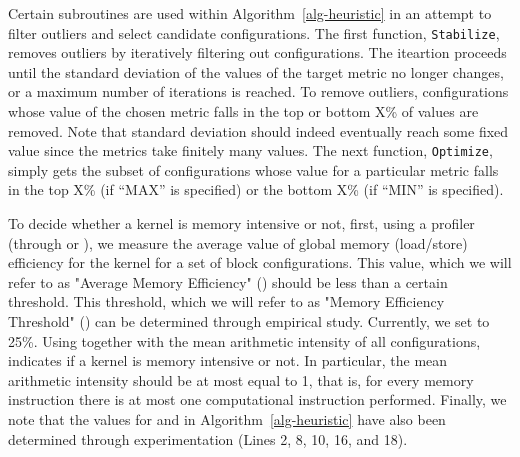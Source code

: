 

Certain subroutines are used within Algorithm~\ref{alg-heuristic}
in an attempt to filter outliers and select candidate configurations.
The first function, \texttt{Stabilize}, removes outliers
by iteratively filtering out configurations.
The iteartion proceeds until the standard deviation of the values
of the target metric no longer changes, or a maximum
number of iterations is reached.
To remove outliers, configurations whose value of the chosen metric 
falls in the top or bottom X\% of values 
are removed.
Note that standard deviation should indeed eventually reach some
fixed value since the metrics take finitely many values.
The next function, \texttt{Optimize}, simply gets
the subset of configurations whose value for a particular 
metric falls in the top X\% (if ``MAX'' is specified) 
or the bottom X\% (if ``MIN'' is specified).


%	


To decide whether a kernel is memory intensive or not, 
first, using a profiler (through {\nvprof} or {\cupti}), 
we measure  the average value of global memory (load/store) 
efficiency for the kernel for a set of block configurations.
This value, which we will refer to as "Average Memory Efficiency" ({\memEfficiency})
should be less than a certain threshold. This threshold, which we will refer to
as "Memory Efficiency Threshold" ({\memThreshold})
can be determined through empirical study.
Currently, we set {\memThreshold} to 25\%.
Using {\memEfficiency} together with the mean arithmetic intensity 
of all configurations, indicates if a kernel is memory intensive or not.
In particular, the mean arithmetic intensity should be at most equal to 1, 
that is, for every memory instruction there is at most one computational
instruction performed. 
%
Finally, we note that the values for {\nparts} and {\nrepeat} in Algorithm~\ref{alg-heuristic} 
have also been determined through experimentation (Lines 2, 8, 10, 16, and 18).
